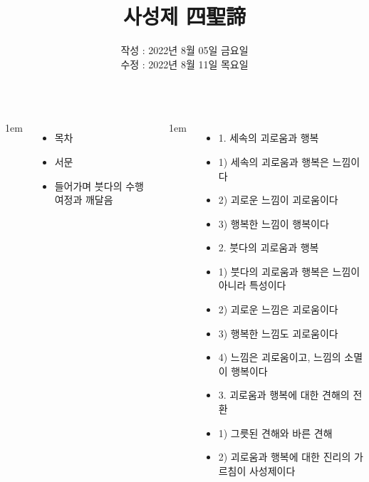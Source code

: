 \documentclass[	14pt, 
							a1paper, 
							portrait, %
							margin=0mm, %
							innermargin=10mm,  		%
							colspace=5mm, 
							subcolspace=0mm
							]{tikzposter}
\title{사성제 四聖諦}
\author{ 	작성 : 2022년 8월 05일 금요일 \\
				수정 : 2022년 8월 11일 목요일  }
\begin{document}
	\maketitle

	\begin{columns}


			{
					\setlength{\leftmargini}{2em}
					\setlength{\labelsep} {1em}
					\begin{itemize}
					\item 목차
					\item 서문
					\item 들어가며  붓다의 수행 여정과 깨달음
					\end{itemize}
			}

			{
					\setlength{\leftmargini}{2em}
					\setlength{\labelsep} {1em}
					\begin{itemize}


					\item 1. 세속의 괴로움과 행복
					\item 1) 세속의 괴로움과 행복은 느낌이다
					\item 2) 괴로운 느낌이 괴로움이다
					\item 3) 행복한 느낌이 행복이다

					\item 2. 붓다의 괴로움과 행복
					\item 1) 붓다의 괴로움과 행복은 느낌이 아니라 특성이다
					\item 2) 괴로운 느낌은 괴로움이다
					\item 3) 행복한 느낌도 괴로움이다
					\item 4) 느낌은 괴로움이고, 느낌의 소멸이 행복이다

					\item 3. 괴로움과 행복에 대한 견해의 전환
					\item 1) 그릇된 견해와 바른 견해
					\item 2) 괴로움과 행복에 대한 진리의 가르침이 사성제이다
					\end{itemize}
			}



\end{columns}
\end{document}
